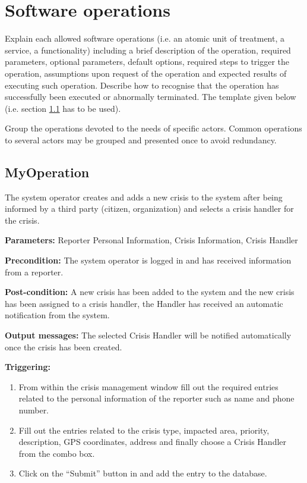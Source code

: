 \chapter{Software operations}
\label{chap:soptware_operations}


Explain each allowed software operations (i.e. an atomic unit of treatment, a service, a functionality) including a brief description of the operation, required parameters, optional parameters, default options, required steps to trigger the operation, assumptions upon request of the operation and expected results of executing such operation.
Describe how to recognise that the operation has successfully been executed or
abnormally terminated. The template given below (i.e. section \ref{operation:MyOperation} has to be used).

Group the operations devoted to the needs of specific actors. Common
operations to several actors may be grouped and presented once to avoid redundancy.


\section{MyOperation}
\label{operation:MyOperation}
The system operator creates and adds a new crisis to the system after being
informed by a third party (citizen, organization) and selects a crisis handler for the crisis.

\begin{description}

\item \textbf{Parameters:} Reporter Personal Information, Crisis Information, Crisis Handler
\item \textbf{Precondition:} The system operator is logged in and has received information from a reporter.
\item \textbf{Post-condition:} A new crisis has been added to the system and the new crisis has been assigned to a crisis handler, the Handler has received an automatic notification from the system.
\item \textbf{Output messages:} The selected Crisis Handler will be notified
automatically once the crisis has been created.

\item \textbf{Triggering:}
\begin{enumerate}
\item From within the crisis management window fill out the required entries related to the personal information of the reporter such as name and phone number.
\item Fill out the entries related to the crisis type, impacted area, priority, description, GPS coordinates, address and finally choose a Crisis Handler from the combo box.
\item Click on the “Submit” button in and add the entry to the database.
\end{enumerate}

 
\end{description}

